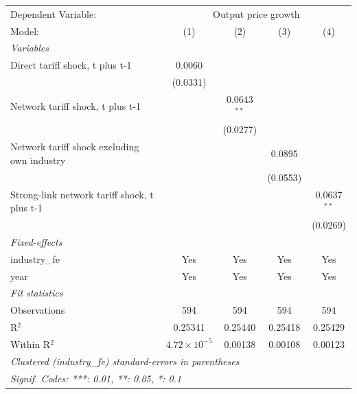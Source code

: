 \begingroup
\centering
\begin{tabular}{lcccc}
   \tabularnewline \midrule \midrule
   Dependent Variable: & \multicolumn{4}{c}{Output price growth}\\
   Model:                                       & (1)                   & (2)           & (3)      & (4)\\  
   \midrule
   \emph{Variables}\\
   Direct tariff shock, t plus t-1              & 0.0060                &               &          &   \\   
                                                & (0.0331)              &               &          &   \\   
   Network tariff shock, t plus t-1             &                       & 0.0643$^{**}$ &          &   \\   
                                                &                       & (0.0277)      &          &   \\   
   Network tariff shock excluding own industry  &                       &               & 0.0895   &   \\   
                                                &                       &               & (0.0553) &   \\   
   Strong-link network tariff shock, t plus t-1 &                       &               &          & 0.0637$^{**}$\\   
                                                &                       &               &          & (0.0269)\\   
   \midrule
   \emph{Fixed-effects}\\
   industry\_fe                                 & Yes                   & Yes           & Yes      & Yes\\  
   year                                         & Yes                   & Yes           & Yes      & Yes\\  
   \midrule
   \emph{Fit statistics}\\
   Observations                                 & 594                   & 594           & 594      & 594\\  
   R$^2$                                        & 0.25341               & 0.25440       & 0.25418  & 0.25429\\  
   Within R$^2$                                 & $4.72\times 10^{-5}$  & 0.00138       & 0.00108  & 0.00123\\  
   \midrule \midrule
   \multicolumn{5}{l}{\emph{Clustered (industry\_fe) standard-errors in parentheses}}\\
   \multicolumn{5}{l}{\emph{Signif. Codes: ***: 0.01, **: 0.05, *: 0.1}}\\
\end{tabular}
\par\endgroup
